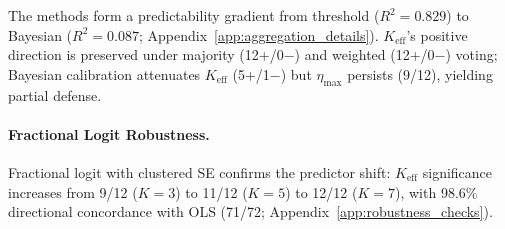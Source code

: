 The methods form a predictability gradient from threshold ($R^2{=}0.829$) to Bayesian ($R^2{=}0.087$; Appendix~\ref{app:aggregation_details}). $K_{\mathrm{eff}}$'s positive direction is preserved under majority (12+/0$-$) and weighted (12+/0$-$) voting; Bayesian calibration attenuates $K_{\mathrm{eff}}$ (5+/1$-$) but $\eta_{\max}$ persists (9/12), yielding partial defense.

\paragraph{Fractional Logit Robustness.}
Fractional logit \citep{papke1996econometric} with clustered SE confirms the predictor shift: $K_{\mathrm{eff}}$ significance increases from 9/12 ($K{=}3$) to 11/12 ($K{=}5$) to 12/12 ($K{=}7$), with 98.6\% directional concordance with OLS (71/72; Appendix~\ref{app:robustness_checks}).
